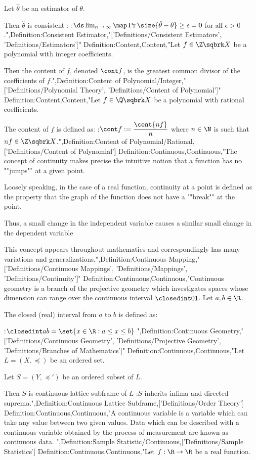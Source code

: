 Let $\hat \theta$ be an estimator of $\theta$.

Then $\hat \theta$ is consistent :
:$\ds \lim_{n \mathop \to \infty} \map \Pr {\size {\hat \theta - \theta} \ge \epsilon} = 0$
for all $\epsilon > 0$.",Definition:Consistent Estimator,"['Definitions/Consistent Estimators', 'Definitions/Estimators']"
Definition:Content,Content,"Let $f \in \Z \sqbrk X$ be a polynomial with integer coefficients.

Then the content of $f$, denoted $\cont f$, is the greatest common divisor of the coefficients of $f$.",Definition:Content of Polynomial/Integer,"['Definitions/Polynomial Theory', 'Definitions/Content of Polynomial']"
Definition:Content,Content,"Let $f \in \Q \sqbrk X$ be a polynomial with rational coefficients.


The content of $f$ is defined as:
:$\cont f := \dfrac {\cont {n f} } n$
where $n \in \N$ is such that $n f \in \Z \sqbrk X$.",Definition:Content of Polynomial/Rational,['Definitions/Content of Polynomial']
Definition:Continuous,Continuous,"The concept of continuity makes precise the intuitive notion that a function has no ""jumps"" at a given point.

Loosely speaking, in the case of a real function, continuity at a point is defined as the property that the graph of the function does not have a ""break"" at the point.

Thus, a small change in the independent variable causes a similar small change in the dependent variable

This concept appears throughout mathematics and correspondingly has many variations and generalizations.",Definition:Continuous Mapping,"['Definitions/Continuous Mappings', 'Definitions/Mappings', 'Definitions/Continuity']"
Definition:Continuous,Continuous,"Continuous geometry is a branch of the projective geometry which investigates spaces whose dimension can range over the continuous interval $\closedint 0 1$.
Let $a, b \in \R$.

The closed (real) interval from $a$ to $b$ is defined as:

:$\closedint a b = \set {x \in \R: a \le x \le b}$
",Definition:Continuous Geometry,"['Definitions/Continuous Geometry', 'Definitions/Projective Geometry', 'Definitions/Branches of Mathematics']"
Definition:Continuous,Continuous,"Let $L = \left({X, \preceq}\right)$ be an ordered set.

Let $S = \left({Y, \preceq'}\right)$ be an ordered subset of $L$.


Then $S$ is continuous lattice subframe of $L$ 
:$S$ inherits infima and directed suprema.",Definition:Continuous Lattice Subframe,['Definitions/Order Theory']
Definition:Continuous,Continuous,"A continuous variable is a variable which can take any value between two given values.
Data which can be described with a continuous variable obtained by the process of measurement are known as continuous data.
",Definition:Sample Statistic/Continuous,['Definitions/Sample Statistics']
Definition:Continuous,Continuous,"Let $f: \R \to \R$ be a real function.


